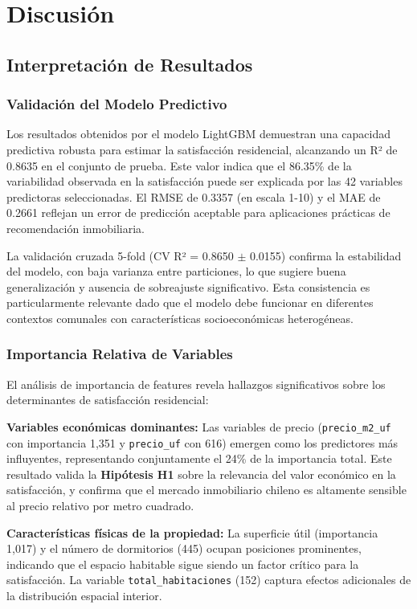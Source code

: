 \section{Discusión}

\subsection{Interpretación de Resultados}

\subsubsection{Validación del Modelo Predictivo}

Los resultados obtenidos por el modelo LightGBM demuestran una capacidad predictiva robusta para estimar la satisfacción residencial, alcanzando un R² de 0.8635 en el conjunto de prueba. Este valor indica que el 86.35\% de la variabilidad observada en la satisfacción puede ser explicada por las 42 variables predictoras seleccionadas. El RMSE de 0.3357 (en escala 1-10) y el MAE de 0.2661 reflejan un error de predicción aceptable para aplicaciones prácticas de recomendación inmobiliaria.

La validación cruzada 5-fold (CV R² = 0.8650 $\pm$ 0.0155) confirma la estabilidad del modelo, con baja varianza entre particiones, lo que sugiere buena generalización y ausencia de sobreajuste significativo. Esta consistencia es particularmente relevante dado que el modelo debe funcionar en diferentes contextos comunales con características socioeconómicas heterogéneas.

\subsubsection{Importancia Relativa de Variables}

El análisis de importancia de features revela hallazgos significativos sobre los determinantes de satisfacción residencial:

\textbf{Variables económicas dominantes:} Las variables de precio (\texttt{precio\_m2\_uf} con importancia 1,351 y \texttt{precio\_uf} con 616) emergen como los predictores más influyentes, representando conjuntamente el 24\% de la importancia total. Este resultado valida la \textbf{Hipótesis H1} sobre la relevancia del valor económico en la satisfacción, y confirma que el mercado inmobiliario chileno es altamente sensible al precio relativo por metro cuadrado.

\textbf{Características físicas de la propiedad:} La superficie útil (importancia 1,017) y el número de dormitorios (445) ocupan posiciones prominentes, indicando que el espacio habitable sigue siendo un factor crítico para la satisfacción. La variable \texttt{total\_habitaciones} (152) captura efectos adicionales de la distribución espacial interior.


